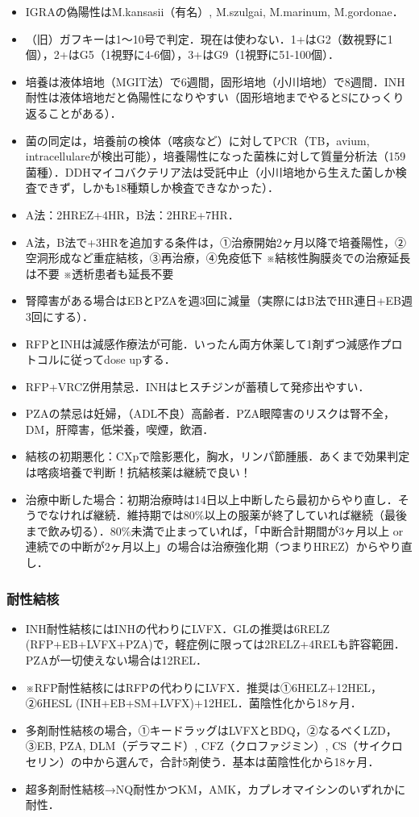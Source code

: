 \begin{itemize}
\item IGRAの偽陽性はM.kansasii（有名）, M.szulgai, M.marinum, M.gordonae．
\item （旧）ガフキーは1〜10号で判定．現在は使わない．1+はG2（数視野に1個），2+はG5（1視野に4-6個），3+はG9（1視野に51-100個）．
\item 培養は液体培地（MGIT法）で6週間，固形培地（小川培地）で8週間．INH耐性は液体培地だと偽陽性になりやすい（固形培地までやるとSにひっくり返ることがある）．
\item 菌の同定は，培養前の検体（喀痰など）に対してPCR（TB，avium, intracellulareが検出可能），培養陽性になった菌株に対して質量分析法（159菌種）．DDHマイコバクテリア法は受託中止（小川培地から生えた菌しか検査できず，しかも18種類しか検査できなかった）．
\item A法：2HREZ+4HR，B法：2HRE+7HR．
\item A法，B法で+3HRを追加する条件は，①治療開始2ヶ月以降で培養陽性，②空洞形成など重症結核，③再治療，④免疫低下 ※結核性胸膜炎での治療延長は不要 ※透析患者も延長不要
\item 腎障害がある場合はEBとPZAを週3回に減量（実際にはB法でHR連日+EB週3回にする）．
\item RFPとINHは減感作療法が可能．いったん両方休薬して1剤ずつ減感作プロトコルに従ってdose upする．
\item RFP+VRCZ併用禁忌．INHはヒスチジンが蓄積して発疹出やすい．
\item PZAの禁忌は妊婦，（ADL不良）高齢者．PZA眼障害のリスクは腎不全，DM，肝障害，低栄養，喫煙，飲酒．
\item 結核の初期悪化：CXpで陰影悪化，胸水，リンパ節腫脹．あくまで効果判定は喀痰培養で判断！抗結核薬は継続で良い！
\item 治療中断した場合：初期治療時は14日以上中断したら最初からやり直し．そうでなければ継続．維持期では80\%以上の服薬が終了していれば継続（最後まで飲み切る）．80\%未満で止まっていれば，「中断合計期間が3ヶ月以上 or 連続での中断が2ヶ月以上」の場合は治療強化期（つまりHREZ）からやり直し．
\end{itemize}


\subsubsection{耐性結核}

\begin{itemize}
\item INH耐性結核にはINHの代わりにLVFX．GLの推奨は6RELZ (RFP+EB+LVFX+PZA)で，軽症例に限っては2RELZ+4RELも許容範囲．PZAが一切使えない場合は12REL．
\item ※RFP耐性結核にはRFPの代わりにLVFX．推奨は①6HELZ+12HEL，②6HESL (INH+EB+SM+LVFX)+12HEL．菌陰性化から18ヶ月．
\item 多剤耐性結核の場合，①キードラッグはLVFXとBDQ，②なるべくLZD，③EB, PZA, DLM（デラマニド）, CFZ（クロファジミン）, CS（サイクロセリン）の中から選んで，合計5剤使う．基本は菌陰性化から18ヶ月．
\item 超多剤耐性結核→NQ耐性かつKM，AMK，カプレオマイシンのいずれかに耐性．
\end{itemize}


